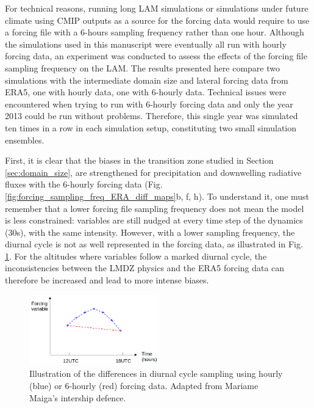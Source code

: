 For technical reasons, running long LAM simulations or simulations under future climate using CMIP outputs as a source for the forcing data would require to use a forcing file with a 6-hours sampling frequency rather than one hour. 
Although the simulations used in this manuscript were eventually all run with hourly forcing data, an experiment was conducted to assess the effects of the forcing file sampling frequency on the LAM. 
The results presented here compare two simulations with the intermediate domain size and lateral forcing data from ERA5, one with hourly data, one with 6-hourly data. Technical issues were encountered when trying to run with 6-hourly forcing data and only the year 2013 could be run without problems. Therefore, this single year was simulated ten times in a row in each simulation setup, constituting two small simulation ensembles.

\hfill

First, it is clear that the biases in the transition zone studied in Section \ref{sec:domain_size}, are strengthened for precipitation and downwelling radiative fluxes with the 6-hourly forcing data (Fig. \ref{fig:forcing_sampling_freq_ERA_diff_maps}b, f, h). To understand it, one must remember that a lower forcing file sampling frequency does not mean the model is less constrained: variables are still nudged at every time step of the dynamics (30s), with the same intensity. However, with a lower sampling frequency, the diurnal cycle is not as well represented in the forcing data, as illustrated in Fig. \ref{fig:diurnal_cycle_sampling}. For the altitudes where variables follow a marked diurnal cycle, the inconsistencies between the LMDZ physics and the ERA5 forcing data can therefore be increased and lead to more intense biases.

\begin{figure}[htbp]
    \centering
    \includegraphics[width=0.5\textwidth]{images/chap4/forcing_sampling_freq/sampling_freq_diurnal_cycle.png}    
    \caption{Illustration of the differences in diurnal cycle sampling using hourly (blue) or 6-hourly (red) forcing data. Adapted from Mariame Maiga's intership defence.
    \label{fig:diurnal_cycle_sampling}}
\end{figure}

